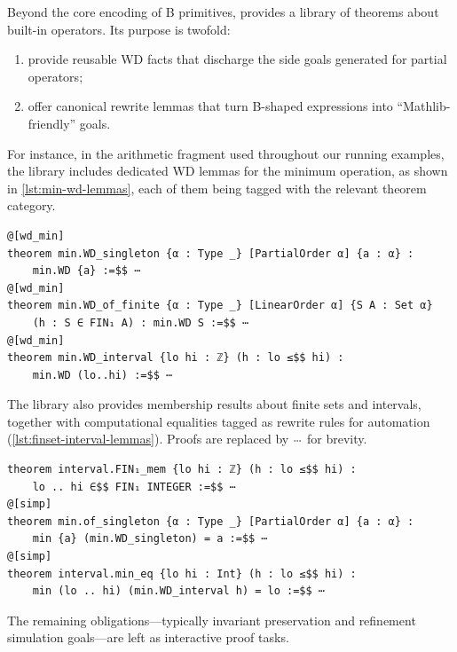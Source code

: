 Beyond the core encoding of B primitives, \barrel provides a library of theorems about built-in operators.
Its purpose is twofold:
\begin{enumerate}
	\item provide reusable WD facts that discharge the side goals generated for partial operators;
	\item offer canonical rewrite lemmas that turn B-shaped expressions into ``Mathlib-friendly'' goals.
\end{enumerate}
For instance, in the arithmetic fragment used throughout our running examples, the library includes dedicated WD lemmas for the minimum operation, as shown in \cref{lst:min-wd-lemmas}, each of them being tagged with the relevant theorem category.

\begin{lstlisting}[language=lean, caption={WD lemmas about extrema in \barrel.}, label=lst:min-wd-lemmas, float]
@[wd_min]
theorem min.WD_singleton {α : Type _} [PartialOrder α] {a : α} :
	min.WD {a} :=$$ ⋯
@[wd_min]
theorem min.WD_of_finite {α : Type _} [LinearOrder α] {S A : Set α}
	(h : S ∈ FIN₁ A) : min.WD S :=$$ ⋯
@[wd_min]
theorem min.WD_interval {lo hi : ℤ} (h : lo ≤$$ hi) :
	min.WD (lo..hi) :=$$ ⋯
\end{lstlisting}

The library also provides membership results about finite sets and intervals, together with computational equalities tagged as rewrite rules for automation (\cref{lst:finset-interval-lemmas}). Proofs are replaced by $\cdot\mkern-5mu\cdot\mkern-5mu\cdot$ for brevity.

\begin{lstlisting}[language=lean, caption={Membership lemmas about finite sets and intervals in \barrel.}, label=lst:finset-interval-lemmas, float]
theorem interval.FIN₁_mem {lo hi : ℤ} (h : lo ≤$$ hi) :
	lo .. hi ∈$$ FIN₁ INTEGER :=$$ ⋯
@[simp]
theorem min.of_singleton {α : Type _} [PartialOrder α] {a : α} :
	min {a} (min.WD_singleton) = a :=$$ ⋯
@[simp]
theorem interval.min_eq {lo hi : Int} (h : lo ≤$$ hi) :
	min (lo .. hi) (min.WD_interval h) = lo :=$$ ⋯
\end{lstlisting}

The remaining obligations---typically invariant preservation and refinement simulation goals---are left as interactive proof tasks.